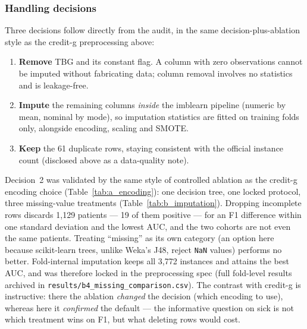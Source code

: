 \subsubsection{Handling decisions}
Three decisions follow directly from the audit, in the same
decision-plus-ablation style as the credit-g preprocessing above:

\begin{enumerate}
\item \textbf{Remove} TBG and its constant flag. A column with zero
observations cannot be imputed without fabricating data; column removal
involves no statistics and is leakage-free.
\item \textbf{Impute} the remaining columns \emph{inside} the imblearn
pipeline (numeric by mean, nominal by mode), so imputation statistics
are fitted on training folds only, alongside encoding, scaling and
SMOTE.
\item \textbf{Keep} the 61 duplicate rows, staying consistent with the
official instance count (disclosed above as a data-quality note).
\end{enumerate}

Decision~2 was validated by the same style of controlled ablation as the
credit-g encoding choice (Table~\ref{tab:a_encoding}): one decision
tree, one locked protocol, three missing-value treatments
(Table~\ref{tab:b_imputation}). Dropping incomplete rows discards
1{,}129 patients --- 19 of them positive --- for an F1 difference within
one standard deviation and the lowest AUC, and the two cohorts are not
even the same patients. Treating ``missing'' as its own category (an
option here because scikit-learn trees, unlike Weka's J48, reject
\texttt{NaN} values) performs no better. Fold-internal imputation keeps
all 3{,}772 instances and attains the best AUC, and was therefore locked
in the preprocessing spec (full fold-level results archived in
\texttt{results/b4\_missing\_comparison.csv}). The contrast with
credit-g is instructive: there the ablation \emph{changed} the decision
(which encoding to use), whereas here it \emph{confirmed} the default
--- the informative question on sick is not which treatment wins on F1,
but what deleting rows would cost.

